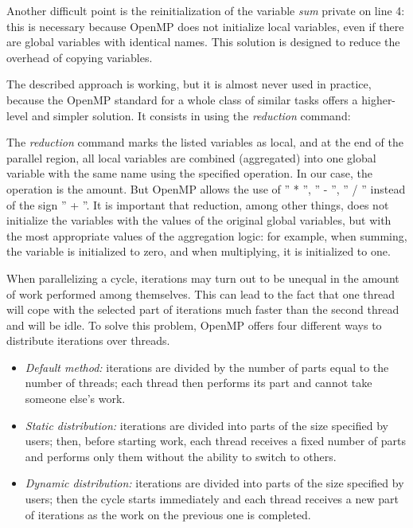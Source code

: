 {	\par Another difficult point is the reinitialization of the variable \textit{sum} \textunderscore private on line 4: this is necessary because OpenMP does not initialize local variables, even if there are global variables with identical names. This solution is designed to reduce the overhead of copying variables.
	\par The described approach is working, but it is almost never used in practice, because the OpenMP standard for a whole class of similar tasks offers a higher-level and simpler solution. It consists in using the \textit{reduction} command:
	\begin{figure}[H]
		
	\end{figure}
	\par The \textit{reduction} command marks the listed variables as local, and at the end of the parallel region, all local variables are combined (aggregated) into one global variable with the same name using the specified operation. In our case, the operation is the amount. But OpenMP allows the use of '' * '', '' - '', '' / '' instead of the sign '' + ''. It is important that reduction, among other things, does not initialize the variables with the values of the original global variables, but with the most appropriate values of the aggregation logic: for example, when summing, the variable is initialized to zero, and when multiplying, it is initialized to one.
	\par When parallelizing a cycle, iterations may turn out to be unequal in the amount of work performed among themselves. This can lead to the fact that one thread will cope with the selected part of iterations much faster than the second thread and will be idle. To solve this problem, OpenMP offers four different ways to distribute iterations over threads. 
	\begin{itemize}
		\item\textit{Default method:} iterations are divided by the number of parts equal to the number of threads; each thread then performs its part and cannot take someone else's work.
		\item\textit{Static distribution:} iterations are divided into parts of the size specified by users; then, before starting work, each thread receives a fixed number of parts and performs only them without the ability to switch to others.
		\item\textit{Dynamic distribution:} iterations are divided into parts of the size specified by users; then the cycle starts immediately and each thread receives a new part of iterations as the work on the previous one is completed.

\end{itemize}}
